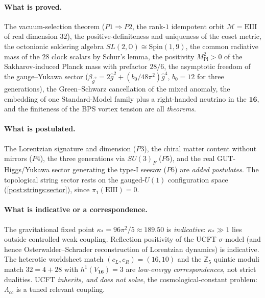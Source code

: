 \paragraph{What is proved.}
The vacuum-selection theorem ($P1\Rightarrow P2$, the rank-$1$
idempotent orbit $\mathcal{M}=\mathrm{EIII}$ of real dimension $32$), the
positive-definiteness and uniqueness of the coset metric, the octonionic
soldering algebra $SL(2,\mathbb{O})\cong\mathrm{Spin}(1,9)$, the common
radiative mass of the $28$ clock scalars by Schur's lemma, the positivity
$M_{\mathrm{Pl}}^{2}>0$ of the Sakharov-induced Planck mass with
prefactor $28/6$, the asymptotic freedom of the gauge--Yukawa sector
($\beta_{\hat g^{2}}=2\hat g^{2}+(b_{0}/48\pi^{2})\hat g^{4}$,
$b_{0}=12$ for three generations), the Green--Schwarz cancellation of the
mixed anomaly, the embedding of one Standard-Model family plus a
right-handed neutrino in the $\mathbf{16}$, and the finiteness of the BPS
vortex tension are all \emph{theorems}.

\paragraph{What is postulated.}
The Lorentzian signature and dimension ($P3$), the chiral matter content
without mirrors ($P4$), the three generations via $SU(3)_{F}$ ($P5$), and
the real GUT-Higgs/Yukawa sector generating the type-I seesaw ($P6$) are
\emph{added postulates}. The topological string sector rests on the
gauged-$U(1)$ configuration space (\autoref{post:strings:sector}), since
$\pi_{1}(\mathrm{EIII})=0$.

\paragraph{What is indicative or a correspondence.}
The gravitational fixed point $\kappa_{\ast}=96\pi^{2}/5\approx189.50$ is
\emph{indicative}: $\kappa_{\ast}\gg1$ lies outside controlled weak
coupling. Reflection positivity of the UCFT $\sigma$-model (and hence
Osterwalder--Schrader reconstruction of Lorentzian dynamics) is
indicative. The heterotic worldsheet match $(c_{L},c_{R})=(16,10)$ and
the $\mathbb{Z}_{5}$ quintic moduli match $32=4+28$ with
$h^{1}(V_{\mathbf{16}})=3$ are \emph{low-energy correspondences}, not
strict dualities. UCFT \emph{inherits, and does not solve}, the
cosmological-constant problem: $\Lambda_{cc}$ is a tuned relevant
coupling.


